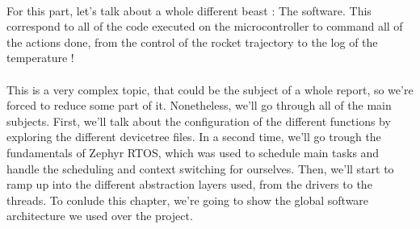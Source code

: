 \paragraph{}
For this part, let's talk about a whole different beast : The software. This
correspond to all of the code executed on the microcontroller to command all of
the actions done, from the control of the rocket trajectory to the log of the
temperature !

\paragraph{}
This is a very complex topic, that could be the subject of a whole report, so
we're forced to reduce some part of it. Nonetheless, we'll go through all of
the main subjects. First, we'll talk about the configuration of the different
functions by exploring the different devicetree files. In a second time, we'll
go trough the fundamentals of Zephyr RTOS, which was used to schedule main
tasks and handle the scheduling and context switching for ourselves. Then,
we'll start to ramp up into the different abstraction layers used, from the
drivers to the threads. To conlude this chapter, we're going to show the global
software architecture we used over the project.







